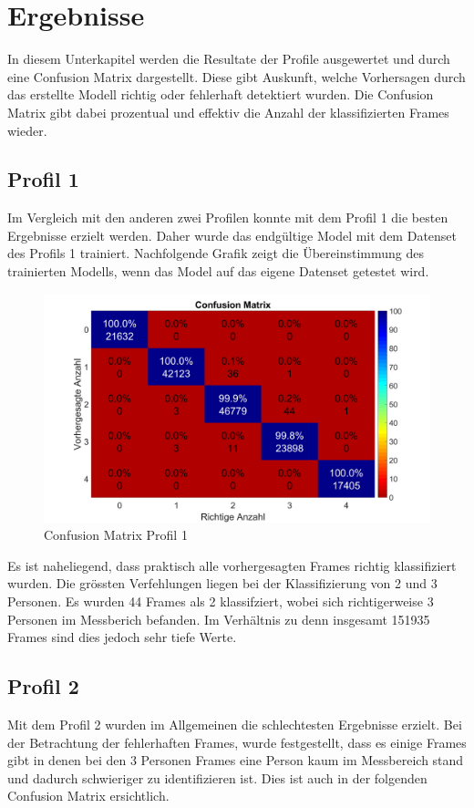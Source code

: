 \section{Ergebnisse}
\label{sec:Ergebnisse}

In diesem Unterkapitel werden die Resultate der Profile ausgewertet und durch eine Confusion Matrix dargestellt. Diese gibt Auskunft, welche Vorhersagen durch das erstellte Modell richtig oder fehlerhaft detektiert wurden. Die Confusion Matrix gibt dabei prozentual und effektiv die Anzahl der klassifizierten Frames wieder. 


\subsection{Profil 1}
\label{subsec:Profil1}
Im Vergleich mit den anderen zwei Profilen konnte mit dem Profil 1 die besten Ergebnisse erzielt werden. Daher wurde das endgültige Model mit dem Datenset des Profils 1 trainiert. Nachfolgende Grafik zeigt die Übereinstimmung des trainierten Modells, wenn das Model auf das eigene Datenset getestet wird. 


\begin{figure}[H]
	\centering
	\label{fig:profil1}
	\includegraphics[width=0.49\linewidth]{fig/Profil_1m}
	\caption[Confusion Matrix Profil 1]{Confusion Matrix Profil 1}

\end{figure}

 Es ist naheliegend, dass praktisch alle vorhergesagten Frames richtig klassifiziert wurden. Die grössten Verfehlungen liegen bei der Klassifizierung von 2 und 3 Personen. Es wurden 44 Frames als 2 klassifziert, wobei sich richtigerweise 3 Personen im Messberich befanden. Im Verhältnis zu denn insgesamt 151935 Frames sind dies jedoch sehr tiefe Werte.

\subsection{Profil 2}
\label{subsec:Profil2}
Mit dem Profil 2 wurden im Allgemeinen die schlechtesten Ergebnisse erzielt. Bei der Betrachtung der fehlerhaften Frames, wurde festgestellt, dass es einige Frames gibt in denen bei den 3 Personen Frames eine Person kaum im Messbereich stand und dadurch schwieriger zu identifizieren ist. Dies ist auch in der folgenden Confusion Matrix ersichtlich.

